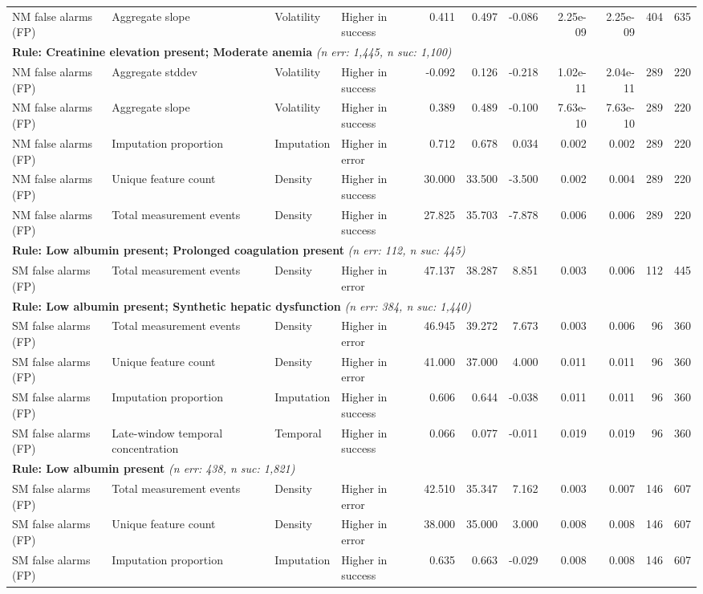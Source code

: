 \documentclass[border=0pt]{standalone}
\begin{document}
\begin{adjustbox}{width=\textwidth}
\begin{tabular}{@{}llllrrrrrrr@{}}
NM false alarms (FP) & Aggregate slope & Volatility & Higher in success & 0.411 & 0.497 & -0.086 & 2.25e-09 & 2.25e-09 & 404 & 635 \\
\multicolumn{11}{l}{\textbf{Rule: Creatinine elevation present; Moderate anemia} \textit{(n err: 1,445, n suc: 1,100)}} \\
NM false alarms (FP) & Aggregate stddev & Volatility & Higher in success & -0.092 & 0.126 & -0.218 & 1.02e-11 & 2.04e-11 & 289 & 220 \\
NM false alarms (FP) & Aggregate slope & Volatility & Higher in success & 0.389 & 0.489 & -0.100 & 7.63e-10 & 7.63e-10 & 289 & 220 \\
NM false alarms (FP) & Imputation proportion & Imputation & Higher in error & 0.712 & 0.678 & 0.034 & 0.002 & 0.002 & 289 & 220 \\
NM false alarms (FP) & Unique feature count & Density & Higher in success & 30.000 & 33.500 & -3.500 & 0.002 & 0.004 & 289 & 220 \\
NM false alarms (FP) & Total measurement events & Density & Higher in success & 27.825 & 35.703 & -7.878 & 0.006 & 0.006 & 289 & 220 \\
\multicolumn{11}{l}{\textbf{Rule: Low albumin present; Prolonged coagulation present} \textit{(n err: 112, n suc: 445)}} \\
SM false alarms (FP) & Total measurement events & Density & Higher in error & 47.137 & 38.287 & 8.851 & 0.003 & 0.006 & 112 & 445 \\
\multicolumn{11}{l}{\textbf{Rule: Low albumin present; Synthetic hepatic dysfunction} \textit{(n err: 384, n suc: 1,440)}} \\
SM false alarms (FP) & Total measurement events & Density & Higher in error & 46.945 & 39.272 & 7.673 & 0.003 & 0.006 & 96 & 360 \\
SM false alarms (FP) & Unique feature count & Density & Higher in error & 41.000 & 37.000 & 4.000 & 0.011 & 0.011 & 96 & 360 \\
SM false alarms (FP) & Imputation proportion & Imputation & Higher in success & 0.606 & 0.644 & -0.038 & 0.011 & 0.011 & 96 & 360 \\
SM false alarms (FP) & Late-window temporal concentration & Temporal & Higher in success & 0.066 & 0.077 & -0.011 & 0.019 & 0.019 & 96 & 360 \\
\multicolumn{11}{l}{\textbf{Rule: Low albumin present} \textit{(n err: 438, n suc: 1,821)}} \\
SM false alarms (FP) & Total measurement events & Density & Higher in error & 42.510 & 35.347 & 7.162 & 0.003 & 0.007 & 146 & 607 \\
SM false alarms (FP) & Unique feature count & Density & Higher in error & 38.000 & 35.000 & 3.000 & 0.008 & 0.008 & 146 & 607 \\
SM false alarms (FP) & Imputation proportion & Imputation & Higher in success & 0.635 & 0.663 & -0.029 & 0.008 & 0.008 & 146 & 607 \\
\bottomrule
\end{tabular}
\end{adjustbox}
\end{document}
